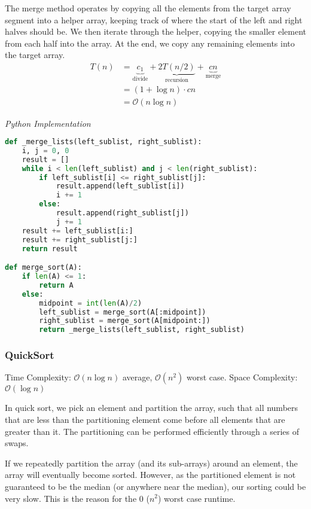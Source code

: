 \documentclass{article}
\newcommand{\bigO}{\ensuremath{\mathcal{O}}}
\begin{document}
    The merge method operates by copying all the elements from the target array segment into a helper array, keeping track of where the start of the left and right halves should be. We then iterate through the helper, copying the smaller element from each half into the array. At the end, we copy any remaining elements into the target array.
    \begin{align*}
        T(n) &= 
            \underbrace{c_1}_\text{divide}
            + \underbrace{2T(n/2)}_\text{recursion}
            + \underbrace{c  n}_\text{merge}\\
        &= (1 + \log n) \cdot cn\\
        &= \bigO(n \log n)
    \end{align*}
    

\vspace{8pt} \emph{Python Implementation}
\begin{lstlisting}[language=Python]
def _merge_lists(left_sublist, right_sublist):
    i, j = 0, 0
    result = []
    while i < len(left_sublist) and j < len(right_sublist):
        if left_sublist[i] <= right_sublist[j]:
            result.append(left_sublist[i])
            i += 1
        else:
            result.append(right_sublist[j])
            j += 1
    result += left_sublist[i:]
    result += right_sublist[j:]
    return result

def merge_sort(A):
    if len(A) <= 1:
        return A
    else:
        midpoint = int(len(A)/2)
        left_sublist = merge_sort(A[:midpoint])
        right_sublist = merge_sort(A[midpoint:])
        return _merge_lists(left_sublist, right_sublist)
\end{lstlisting}
    
    \subsubsection{QuickSort}
     Time Complexity: $\bigO (n \log n)$ average, $\bigO (n^2)$ worst case. Space Complexity: $\bigO (\log n )$
     
     In quick sort, we pick an element and partition the array, such that all numbers that are less than the partitioning element come before all elements that are greater than it. The partitioning can be performed efficiently through a series of swaps.

    If we repeatedly partition the array (and its sub-arrays) around an element, the array will eventually become sorted. However, as the partitioned element is not guaranteed to be the median (or anywhere near the median), our sorting could be very slow. This is the reason for the 0 ($n^2$) worst case runtime.
    
\end{document}
